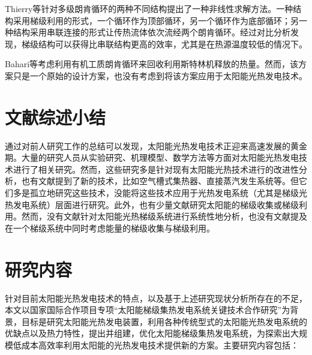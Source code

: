 Thierry等\cite{Thierry2016}针对多级朗肯循环的两种不同结构提出了一种非线性求解方法。一种结构采用梯级利用的形式，一个循环作为顶部循环，另一个循环作为底部循环；另一种结构采用串联连接的形式让传热流体依次流经两个朗肯循环。经过对比分析发现，梯级结构可以获得比串联结构更高的效率，尤其是在热源温度较低的情况下。

Bahari等\cite{Bahari2016}考虑利用有机工质朗肯循环来回收利用斯特林机释放的热量。然而，该方案只是一个原始的设计方案，也没有考虑到将该方案应用于太阳能光热发电技术。

\section{文献综述小结}
通过对前人研究工作的总结可以发现，太阳能光热发电技术正迎来高速发展的黄金期。大量的研究人员从实验研究、机理模型、数学方法等方面对太阳能光热发电技术进行了相关研究。然而，这些研究多是针对现有太阳能光热技术进行的改进性分析，也有文献提到了新的技术，比如空气槽式集热器、直接蒸汽发生系统等。但它们多是孤立地研究这些技术，没能将这些技术应用于光热发电系统（尤其是梯级光热发电系统）层面进行研究。此外，也有少量文献研究太阳能的梯级收集或梯级利用。然而，没有文献针对太阳能光热梯级系统进行系统性地分析，也没有文献提及在一个梯级系统中同时考虑能量的梯级收集与梯级利用。

\section{研究内容}
\label{sec:researchContent}

针对目前太阳能光热发电技术的特点，以及基于上述研究现状分析所存在的不足，本文以国家国际合作项目专项“太阳能梯级集热发电系统关键技术合作研究”为背景，目标是研究太阳能光热发电装置，利用各种传统型式的太阳能光热发电系统的优缺点以及热力特性，提出并组建，优化太阳能梯级集热发电系统，为探索出大规模低成本高效率利用太阳能的光热发电技术提供新的方案。主要研究内容包括：


